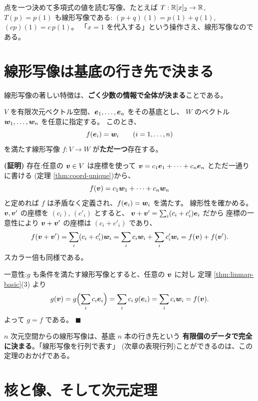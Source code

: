 \begin{rei}[評価写像]
点を一つ決めて多項式の値を読む写像、たとえば
$T : \mathbb{R}[x]_2 \to \mathbb{R}$, $T(p) = p(1)$ も線形写像である:
$(p + q)(1) = p(1) + q(1)$, $(cp)(1) = c\,p(1)$。
「$x = 1$ を代入する」という操作さえ、線形写像なのである。
\end{rei}

\section{線形写像は基底の行き先で決まる}

線形写像の著しい特徴は、\textbf{ごく少数の情報で全体が決まる}ことである。

\begin{teiri}[基底の行き先が写像を決める]\label{thm:linmap-basis}
$V$ を有限次元ベクトル空間、$\bm{e}_1, \dots, \bm{e}_n$ をその基底とし、
$W$ のベクトル $\bm{w}_1, \dots, \bm{w}_n$ を任意に指定する。
このとき、
\[
f(\bm{e}_i) = \bm{w}_i \qquad (i = 1, \dots, n)
\]
を満たす線形写像 $f : V \to W$ が\textbf{ただ一つ}存在する。
\end{teiri}

\noindent\textbf{(証明)}\quad
存在:任意の $\bm{v} \in V$ は座標を使って
$\bm{v} = c_1\bm{e}_1 + \cdots + c_n\bm{e}_n$ とただ一通りに書ける
(定理 \ref{thm:coord-unique})から、
\[
f(\bm{v}) = c_1\bm{w}_1 + \cdots + c_n\bm{w}_n
\]
と定めれば $f$ は矛盾なく定義され、$f(\bm{e}_i) = \bm{w}_i$ を満たす。
線形性を確かめる。$\bm{v}, \bm{v}'$ の座標を $(c_i)$, $(c'_i)$ とすると、
$\bm{v} + \bm{v}' = \sum_i (c_i + c'_i)\bm{e}_i$ だから
座標の一意性により $\bm{v} + \bm{v}'$ の座標は $(c_i + c'_i)$ であり、
\[
f(\bm{v} + \bm{v}') = \sum_i (c_i + c'_i)\bm{w}_i
= \sum_i c_i\bm{w}_i + \sum_i c'_i\bm{w}_i = f(\bm{v}) + f(\bm{v}').
\]
スカラー倍も同様である。

一意性:$g$ も条件を満たす線形写像とすると、任意の $\bm{v}$ に対し
定理 \ref{thm:linmap-basic}(3) より
\[
g(\bm{v}) = g\Bigl(\sum_i c_i\bm{e}_i\Bigr) = \sum_i c_i\,g(\bm{e}_i)
= \sum_i c_i\bm{w}_i = f(\bm{v}).
\]
よって $g = f$ である。 $\blacksquare$

$n$ 次元空間からの線形写像は、基底 $n$ 本の行き先という
\textbf{有限個のデータで完全に決まる}。「線形写像を行列で表す」
(次章の表現行列)ことができるのは、この定理のおかげである。

\section{核と像、そして次元定理}

